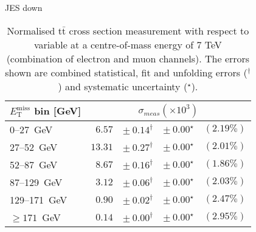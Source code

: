 \documentclass{article}
\newcommand{\ttbar}{\ensuremath{\text{t}\bar{\text{t}}}\xspace}
\newcommand{\GeV}{GeV}
\begin{document}
JES down
\begin{table}[htbp]
\setlength{\tabcolsep}{2pt}
\centering
\caption{Normalised \ttbar cross section measurement with respect to \MET variable
at a centre-of-mass energy of 7 TeV (combination of electron and muon channels). The errors shown are combined statistical, fit and unfolding errors ($^\dagger$) and systematic uncertainty ($^\star$).}
\label{tab:MET_xsections_7TeV_JES_down_combined}
\begin{tabular}{lrrrr}
\hline
$E_{\mathrm{T}}^{\mathrm{miss}}$ bin [\GeV] & \multicolumn{4}{c}{$\sigma_{meas} \left(\times 10^{3}\right)$}\\ 
\hline
0--27~\GeV &  $6.57$ & $ \pm~ 0.14^\dagger$ & $ \pm~ 0.00^\star$ & $(2.19\%)$\\ 
27--52~\GeV &  $13.31$ & $ \pm~ 0.27^\dagger$ & $ \pm~ 0.00^\star$ & $(2.01\%)$\\ 
52--87~\GeV &  $8.67$ & $ \pm~ 0.16^\dagger$ & $ \pm~ 0.00^\star$ & $(1.86\%)$\\ 
87--129~\GeV &  $3.12$ & $ \pm~ 0.06^\dagger$ & $ \pm~ 0.00^\star$ & $(2.03\%)$\\ 
129--171~\GeV &  $0.90$ & $ \pm~ 0.02^\dagger$ & $ \pm~ 0.00^\star$ & $(2.47\%)$\\ 
$\geq 171$~\GeV &  $0.14$ & $ \pm~ 0.00^\dagger$ & $ \pm~ 0.00^\star$ & $(2.95\%)$\\ 
\hline 
\end{tabular}
\end{table}
\end{document}
